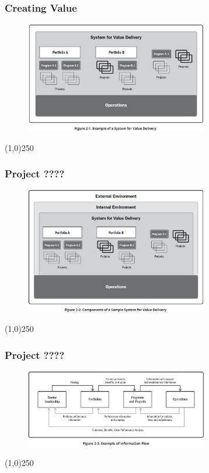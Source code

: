 \begin{frame}
\frametitle{Creating Value}
 \begin{figure}
    \centering
        \includegraphics[width = 8cm]{../images/standard/Fig2-1.jpg}
    \label{standardfig:2-1}
 \end{figure}
\end{frame}
\begin{center}\line(1,0){250}\end{center}


\begin{frame}
\frametitle{Project ????}
 \begin{figure}
    \centering
        \includegraphics[width = 8cm]{../images/standard/Fig2-2.jpg}
    \label{standardfig:2-2}
 \end{figure}
\end{frame}
\begin{center}\line(1,0){250}\end{center}






\begin{frame}
\frametitle{Project ????}
 \begin{figure}
    \centering
        \includegraphics[width = 8cm]{../images/standard/Fig2-3.jpg}
    \label{standardfig:2-3}
 \end{figure}
\end{frame}
\begin{center}\line(1,0){250}\end{center}



